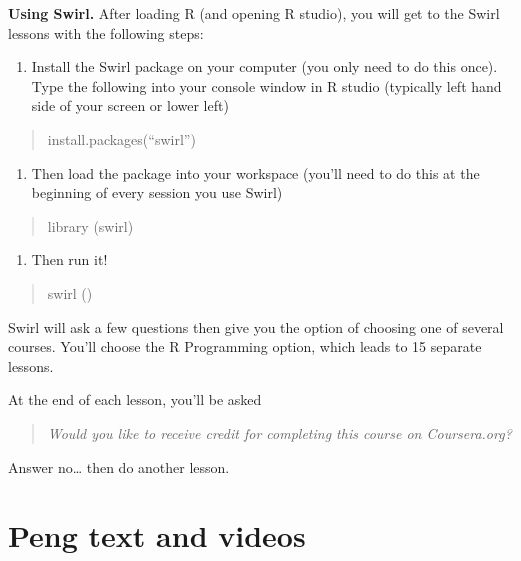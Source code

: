 \documentclass[
  openany]{book}
\providecommand{\tightlist}{%
  \setlength{\itemsep}{0pt}\setlength{\parskip}{0pt}}
\begin{document}
\textbf{Using Swirl.} After loading R (and opening R studio), you will get to the Swirl lessons with the following steps:

\begin{enumerate}
\def\labelenumi{\arabic{enumi})}
\tightlist
\item
  Install the Swirl package on your computer (you only need to do this once). Type the following into your console window in R studio (typically left hand side of your screen or lower left)
\end{enumerate}

\begin{quote}
install.packages(``swirl'')
\end{quote}

\begin{enumerate}
\def\labelenumi{\arabic{enumi})}
\setcounter{enumi}{1}
\tightlist
\item
  Then load the package into your workspace (you'll need to do this at the beginning of every session you use Swirl)
\end{enumerate}

\begin{quote}
library (swirl)
\end{quote}

\begin{enumerate}
\def\labelenumi{\arabic{enumi})}
\setcounter{enumi}{1}
\tightlist
\item
  Then run it!
\end{enumerate}

\begin{quote}
swirl ()
\end{quote}

Swirl will ask a few questions then give you the option of choosing one of several courses. You'll choose the R Programming option, which leads to 15 separate lessons.

At the end of each lesson, you'll be asked

\begin{quote}
\emph{Would you like to receive credit for completing this course on Coursera.org?}
\end{quote}

Answer no\ldots{} then do another lesson.

\hypertarget{peng-text-and-videos}{%
\section{Peng text and videos}\label{peng-text-and-videos}}
\end{document}

